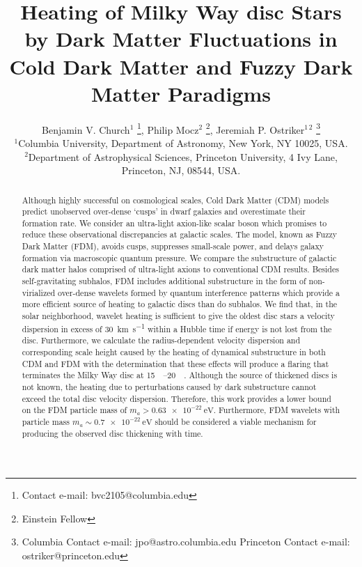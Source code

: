 \documentclass[usenatbib]{mnras}
\newcommand{\squote}[1]{\lq #1\rq}
\begin{document}
\title[Dark Matter Heating]{Heating of Milky Way disc Stars by Dark Matter Fluctuations in Cold Dark Matter and Fuzzy Dark Matter Paradigms}
\author[B. V. Church et al.]{
Benjamin V. Church$^{1}$ \thanks{Contact e-mail: bvc2105@columbia.edu}, Philip Mocz$^{2}$ \thanks{Einstein Fellow},
Jeremiah P. Ostriker$^{1 \, 2}$ \thanks{Columbia Contact e-mail: jpo@astro.columbia.edu 
\newline
Princeton Contact e-mail: ostriker@princeton.edu} 
\\
$^{1}$Columbia University, Department of Astronomy, New York, NY 10025, USA.
\\
$^{2}$Department of Astrophysical Sciences, Princeton University, 4 Ivy Lane, Princeton, NJ, 08544, USA.}
\maketitle
\begin{abstract}
Although highly successful on cosmological scales, Cold Dark Matter (CDM) models predict unobserved over-dense \squote{cusps} in dwarf galaxies and overestimate their formation rate. We consider an ultra-light axion-like scalar boson which promises to reduce these observational discrepancies at galactic scales. The model, known as Fuzzy Dark Matter (FDM), avoids cusps, suppresses small-scale power, and delays galaxy formation via macroscopic quantum pressure. We compare the substructure of galactic dark matter halos comprised of ultra-light axions to conventional CDM results. Besides self-gravitating subhalos, FDM includes additional substructure in the form of non-virialized over-dense wavelets formed by quantum interference patterns which provide a more efficient source of heating to galactic discs than do subhalos. We find that, in the solar neighborhood, wavelet heating is sufficient to give the oldest disc stars a velocity dispersion in excess of \SI{30}{\kilo\meter\per\second} within a Hubble time if energy is not lost from the disc. 
Furthermore, we calculate the radius-dependent velocity dispersion and corresponding scale height caused by the heating of dynamical substructure in both CDM and FDM with the determination that these effects will produce a flaring that terminates the Milky Way disc at \SIrange{15}{20}{\kilo \parsec}. Although the source of thickened discs is not known, the heating due to perturbations caused by dark substructure cannot exceed the total disc velocity dispersion. Therefore, this work provides a lower bound on the FDM particle mass of $m_a > \SI{0.63 e-22}{\electronvolt}$. Furthermore, FDM wavelets with particle mass $m_a \sim \SI{0.7e-22}{\electronvolt}$ should be considered a viable mechanism for producing the observed disc thickening with time.
\end{abstract}
\end{document}
